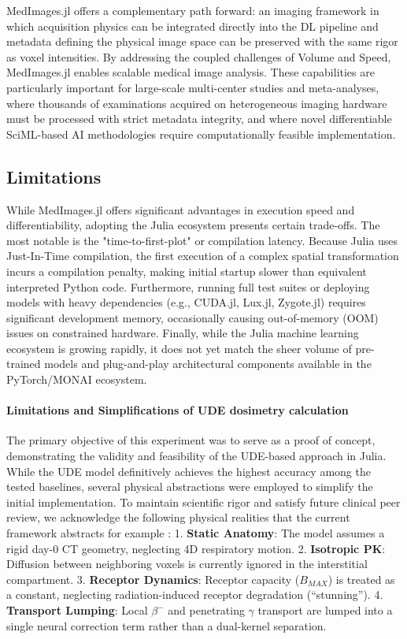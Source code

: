 \documentclass[a4paper,10pt,preprint]{elsarticle}
\begin{document}
MedImages.jl offers a complementary path forward: an imaging framework in which acquisition physics can be integrated directly into the DL pipeline and metadata defining the physical image space can be preserved with the same rigor as voxel intensities. By addressing the coupled challenges of Volume and Speed, MedImages.jl enables scalable medical image analysis. These capabilities are particularly important for large-scale multi-center studies and meta-analyses, where thousands of examinations acquired on heterogeneous imaging hardware must be processed with strict metadata integrity, and where novel differentiable SciML-based AI methodologies require computationally feasible implementation\cite{Shi_2023}.

\subsection*{Limitations}
While MedImages.jl offers significant advantages in execution speed and differentiability, adopting the Julia ecosystem presents certain trade-offs. The most notable is the "time-to-first-plot" or compilation latency. Because Julia uses Just-In-Time compilation, the first execution of a complex spatial transformation incurs a compilation penalty, making initial startup slower than equivalent interpreted Python code. Furthermore, running full test suites or deploying models with heavy dependencies (e.g., CUDA.jl, Lux.jl, Zygote.jl) requires significant development memory, occasionally causing out-of-memory (OOM) issues on constrained hardware. Finally, while the Julia machine learning ecosystem is growing rapidly, it does not yet match the sheer volume of pre-trained models and plug-and-play architectural components available in the PyTorch/MONAI ecosystem.


\paragraph{Limitations and Simplifications of UDE dosimetry calculation}
The primary objective of this experiment was to serve as a proof of concept, demonstrating the validity and feasibility of the UDE-based approach in Julia. While the UDE model definitively achieves the highest accuracy among the tested baselines, several physical abstractions were employed to simplify the initial implementation. To maintain scientific rigor and satisfy future clinical peer review, we acknowledge the following physical realities that the current framework abstracts for example :
1. \textbf{Static Anatomy}: The model assumes a rigid day-0 CT geometry, neglecting 4D respiratory motion.
2. \textbf{Isotropic PK}: Diffusion between neighboring voxels is currently ignored in the interstitial compartment.
3. \textbf{Receptor Dynamics}: Receptor capacity ($B_{MAX}$) is treated as a constant, neglecting radiation-induced receptor degradation (``stunning'').
4. \textbf{Transport Lumping}: Local $\beta^-$ and penetrating $\gamma$ transport are lumped into a single neural correction term rather than a dual-kernel separation.
\end{document}
